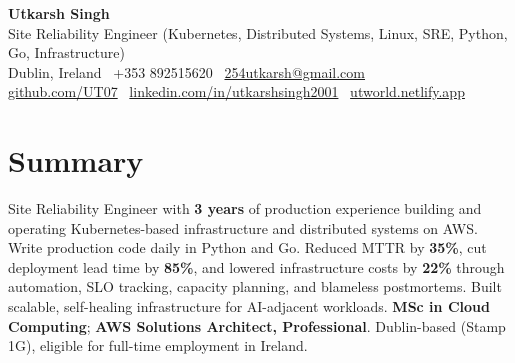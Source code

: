 \documentclass[10pt,a4paper]{article}
\begin{document}
\begin{center}
{\Large \textbf{Utkarsh Singh}}\\[0.04em]
{\normalsize Site Reliability Engineer (Kubernetes, Distributed Systems, Linux, SRE, Python, Go, Infrastructure)}\\[0.08em]
Dublin, Ireland \textbar\ +353 892515620 \textbar\ \href{mailto:254utkarsh@gmail.com}{254utkarsh@gmail.com}\\[0.08em]
\href{https://github.com/UT07}{github.com/UT07} \textbar\
\href{https://www.linkedin.com/in/utkarshsingh2001/}{linkedin.com/in/utkarshsingh2001} \textbar\
\href{https://utworld.netlify.app}{utworld.netlify.app}
\end{center}
\vspace{0.06em}

\section*{Summary}
Site Reliability Engineer with \textbf{3 years} of production experience building and operating Kubernetes-based infrastructure and distributed systems on AWS. Write production code daily in Python and Go. Reduced MTTR by \textbf{35\%}, cut deployment lead time by \textbf{85\%}, and lowered infrastructure costs by \textbf{22\%} through automation, SLO tracking, capacity planning, and blameless postmortems. Built scalable, self-healing infrastructure for AI-adjacent workloads. \textbf{MSc in Cloud Computing}; \textbf{AWS Solutions Architect, Professional}. Dublin-based (Stamp 1G), eligible for full-time employment in Ireland.

\end{document}
